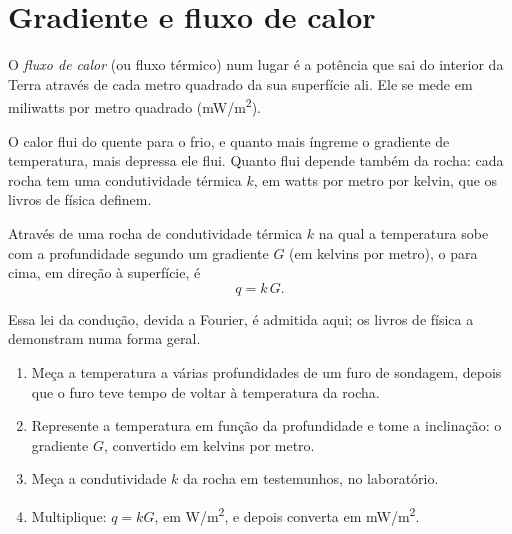 \section{Gradiente e fluxo de calor}

\begin{definition}\label{def:g12:internal-heat:heat-flow}
O \emph{fluxo de calor} (ou fluxo térmico) num lugar é
a potência que sai do interior da Terra através de cada metro quadrado da
sua superfície ali. Ele se mede em miliwatts por metro quadrado
(\unit{mW/m^2}).
\end{definition}

O calor flui do quente para o frio, e quanto mais íngreme o gradiente de
temperatura, mais depressa ele flui. Quanto flui depende também da rocha:
cada rocha tem uma condutividade térmica $k$, em watts por metro por kelvin,
que os livros de física definem.

\begin{proposition}\label{prop:g12:internal-heat:fourier}
Através de uma rocha de condutividade térmica $k$ na qual a temperatura sobe
com a profundidade segundo um gradiente $G$ (em kelvins por metro), o  para cima, em direção à superfície, é
\[
  q = k\,G .
\]
\end{proposition}

Essa lei da condução, devida a Fourier, é admitida aqui; os livros de física
a demonstram numa forma geral.

\begin{method}\label{met:g12:internal-heat:borehole}
\begin{enumerate}
  \item Meça a temperatura a várias profundidades de um furo de sondagem,
        depois que o furo teve tempo de voltar à temperatura da rocha.
  \item Represente a temperatura em função da profundidade e tome a
        inclinação: o gradiente $G$, convertido em kelvins por metro.
  \item Meça a condutividade $k$ da rocha em testemunhos, no laboratório.
  \item Multiplique: $q = kG$, em \unit{W/m^2}, e depois converta em
        \unit{mW/m^2}.
\end{enumerate}
\end{method}

